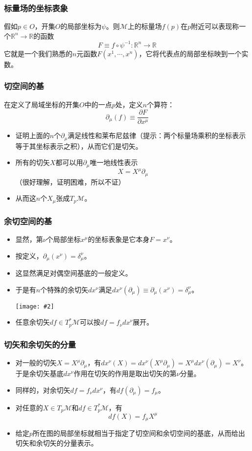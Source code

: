 \documentclass[CJK]{beamer}
\newcommand{\reals}{\mathbb{R}}
\newcommand{\mani}{\mathcal{M}}
\newcommand{\cpic}[2]{
\begin{center}
\texttt{[image: \#2]}
\end{center}
}
\begin{document}
\begin{frame}
\frametitle{\bch 标量场的坐标表象 \ech}
\bch
假如$p\in O$，开集$O$的局部坐标为$\psi$。则$\mani$上的标量场$f(p)$在$p$附近可以表现称一个$\reals^n \to \reals$的函数
$$
F \equiv f \circ \psi^{-1} :\reals^n \to \reals
$$
它就是一个我们熟悉的$n$元函数$F(x^1,\cdots,x^n)$，它将代表点的局部坐标映到一个实数。
\ech
\end{frame}


\begin{frame}
\frametitle{\bch 切空间的基 \ech}
\bch
在定义了局域坐标的开集$O$中的一点$p$处，定义$n$个算符：
$$
\partial_\mu (f) \equiv \frac{\partial F}{\partial x^\mu}
$$
\begin{itemize}
\item 证明上面的$n$个$\partial_\mu$满足线性和莱布尼兹律（提示：两个标量场乘积的坐标表示等于其坐标表示之积），从而它们是切矢。
\item 所有的切矢$X$都可以用$\partial_\mu$唯一地线性表示{\color{blue} $$ X = X^\mu \partial_\mu$$}（很好理解，证明困难，所以不证）
\item 从而这$n$个$X_\mu$张成$T_p \mani$。
\end{itemize}
\ech
\end{frame}

\begin{frame}
\frametitle{\bch 余切空间的基 \ech}
\bch
\begin{itemize}
\item 显然，第$\nu$个局部坐标$x^\mu$的坐标表象是它本身$F = x^\nu$。
\item 按定义，$\partial_\mu (x^\nu) = \delta_\mu^\nu$。
\item 这显然满足对偶空间基底的一般定义。
\item 于是有$n$个特殊的余切矢$dx^\nu$满足$dx^\nu(\partial_\mu) \equiv \partial_\mu (x^\nu) = \delta_\mu^\nu$。
\cpic{0.15}{ques}
\item 任意余切矢$df\in T_p^* \mani $可以按$df = f_\nu dx^\nu$展开。
\end{itemize}

\ech
\end{frame}


\begin{frame}
\frametitle{\bch 切矢和余切矢的分量 \ech}
\bch
\begin{itemize}
\item 对一般的切矢$X = X^\mu \partial_\mu$，有$dx^\nu (X) = dx^\nu (X^\mu \partial_\mu) = X^\mu dx^\nu ( \partial_\mu) = X^\nu$。于是余切矢基底$dx^\nu$作用在切矢的作用是取出切矢的第$\nu$分量。
\item 同样的，对余切矢$df = f_\nu dx^\nu$，有$df(\partial_\mu) = f_\mu$。
\item 对任意的$X\in T_p \mani$和$df\in T_p^* \mani$，有{\color{blue}$$df(X) = f_\mu X^\mu$$}
\item 给定$p$所在图的局部坐标就相当于指定了切空间和余切空间的基底，从而给出切矢和余切矢的分量表示。
\end{itemize}
\ech
\end{frame}
\end{document}

